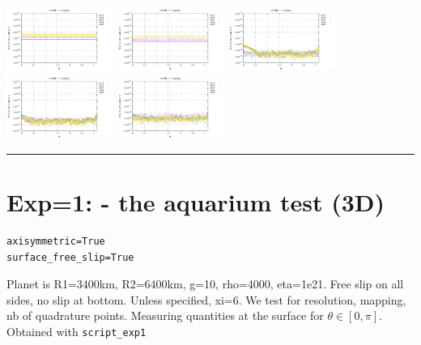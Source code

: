 \noindent
\includegraphics[width=3.5cm]{python_codes/fieldstone_152/RESULTS/exp1_2D/sr2_128_m2}
\includegraphics[width=3.5cm]{python_codes/fieldstone_152/RESULTS/exp1_2D/sr2_128_m3}
\includegraphics[width=3.5cm]{python_codes/fieldstone_152/RESULTS/exp1_2D/sr2_128_m4}
\includegraphics[width=3.5cm]{python_codes/fieldstone_152/RESULTS/exp1_2D/sr2_128_m5}
\includegraphics[width=3.5cm]{python_codes/fieldstone_152/RESULTS/exp1_2D/sr2_128_m6}

\hrule







\newpage
\section*{Exp=1: - the aquarium test (3D)}

\begin{lstlisting}
axisymmetric=True
surface_free_slip=True
\end{lstlisting}


Planet is R1=3400km, R2=6400km, g=10, rho=4000, eta=1e21.
Free slip on all sides, no slip at bottom. Unless specified, xi=6.
We test for resolution, mapping, nb of quadrature points.
Measuring quantities at the surface for $\theta\in[0,\pi]$.
Obtained with {\tt script\_exp1}


